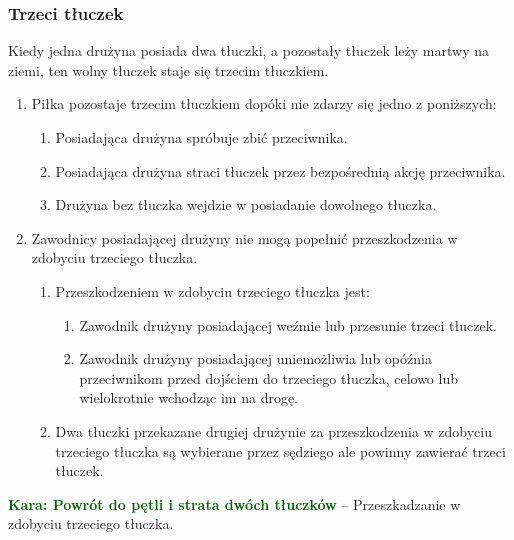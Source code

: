 \documentclass[11pt,a4paper]{article}
\newcommand\penaltyd[2]{\bgroup\textcolor{darkgreen}{\textbf{Kara: #1}} -- #2}
\begin{document}
\subsubsection{Trzeci tłuczek}
Kiedy jedna drużyna posiada dwa tłuczki, a pozostały tłuczek leży martwy na ziemi, ten wolny tłuczek staje się trzecim tłuczkiem.
\begin{enumerate}
  \item Piłka pozostaje trzecim tłuczkiem dopóki nie zdarzy się jedno z poniższych:
  \begin{enumerate}
    \item Posiadająca drużyna spróbuje zbić przeciwnika.
    \item Posiadająca drużyna straci tłuczek przez bezpośrednią akcję przeciwnika.
    \item Drużyna bez tłuczka wejdzie w posiadanie dowolnego tłuczka.
  \end{enumerate}
  \item Zawodnicy posiadającej drużyny nie mogą popełnić przeszkodzenia w zdobyciu trzeciego tłuczka.
  \begin{enumerate}
    \item Przeszkodzeniem w zdobyciu trzeciego tłuczka jest:
    \begin{enumerate}
      \item Zawodnik drużyny posiadającej weźmie lub przesunie trzeci tłuczek.
      \item Zawodnik drużyny posiadającej uniemożliwia lub opóźnia przeciwnikom przed dojściem do trzeciego tłuczka, celowo lub wielokrotnie wchodząc im na drogę.
    \end{enumerate}
    \item Dwa tłuczki przekazane drugiej drużynie za przeszkodzenia w zdobyciu trzeciego tłuczka są wybierane przez sędziego ale powinny zawierać trzeci tłuczek.
  \end{enumerate}
\end{enumerate}

\penaltyd{Powrót do pętli i strata dwóch tłuczków}{Przeszkadzanie w zdobyciu trzeciego tłuczka.}
\end{document}
